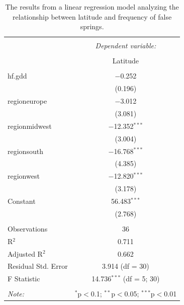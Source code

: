 \documentclass{article}\usepackage[]{graphicx}\usepackage[]{color}
\begin{document}
\begin{table}[!htbp] \centering 
  \caption{The results from a linear regression model analyzing the relationship between latitude and frequency of false springs.} 
  \label{} 
\begin{tabular}{@{\extracolsep{5pt}}lc} 
\\[-1.8ex]\hline 
\hline \\[-1.8ex] 
 & \multicolumn{1}{c}{\textit{Dependent variable:}} \\ 
\cline{2-2} 
\\[-1.8ex] & Latitude \\ 
\hline \\[-1.8ex] 
 hf.gdd & $-$0.252 \\ 
  & (0.196) \\ 
  regioneurope & $-$3.012 \\ 
  & (3.081) \\ 
  regionmidwest & $-$12.352$^{***}$ \\ 
  & (3.004) \\ 
  regionsouth & $-$16.768$^{***}$ \\ 
  & (4.385) \\ 
  regionwest & $-$12.820$^{***}$ \\ 
  & (3.178) \\ 
  Constant & 56.483$^{***}$ \\ 
  & (2.768) \\ 
 \hline \\[-1.8ex] 
Observations & 36 \\ 
R$^{2}$ & 0.711 \\ 
Adjusted R$^{2}$ & 0.662 \\ 
Residual Std. Error & 3.914 (df = 30) \\ 
F Statistic & 14.736$^{***}$ (df = 5; 30) \\ 
\hline 
\hline \\[-1.8ex] 
\textit{Note:}  & \multicolumn{1}{r}{$^{*}$p$<$0.1; $^{**}$p$<$0.05; $^{***}$p$<$0.01} \\ 
\end{tabular} 
\end{table} 
\end{document}
